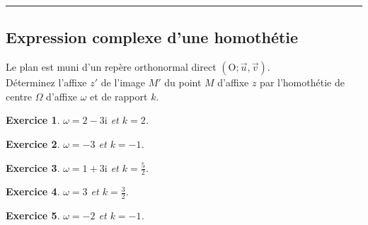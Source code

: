 \documentclass[a4paper]{article}
\newtheorem{Exercice}{Exercice}
\begin{document}
\vspace{0.5cm}
\hrule
\medskip
\begin{minipage}{0.45\linewidth}
  \vspace{0.5cm}
\begin{center}
\subsection*{Expression complexe d'une homoth\'etie}
\end{center}%
\vspace{0.5cm}
Le plan est muni d'un rep\`ere orthonormal direct $\left(\mathrm{O};\vec{u},\vec{v}\right)$.\\D\'eterminez l'affixe $z'$ de l'image $M'$ du point $M$ d'affixe $z$ par l'homoth\'etie de centre $\Omega$ d'affixe $\omega$ et de rapport $k$.
\begin{Exercice}
$\displaystyle \omega=2-3\mathrm{i}$ et $\displaystyle k=2$.
\end{Exercice}\begin{Exercice}
$\displaystyle \omega=-3$ et $\displaystyle k=-1$.
\end{Exercice}\begin{Exercice}
$\displaystyle \omega=1+3\mathrm{i}$ et $\displaystyle k=\frac{5}{2}$.
\end{Exercice}\begin{Exercice}
$\displaystyle \omega=3$ et $\displaystyle k=\frac{3}{2}$.
\end{Exercice}\begin{Exercice}
$\displaystyle \omega=-2$ et $\displaystyle k=-1$.
\end{Exercice}
\end{minipage}
\hfill%
\end{document}
